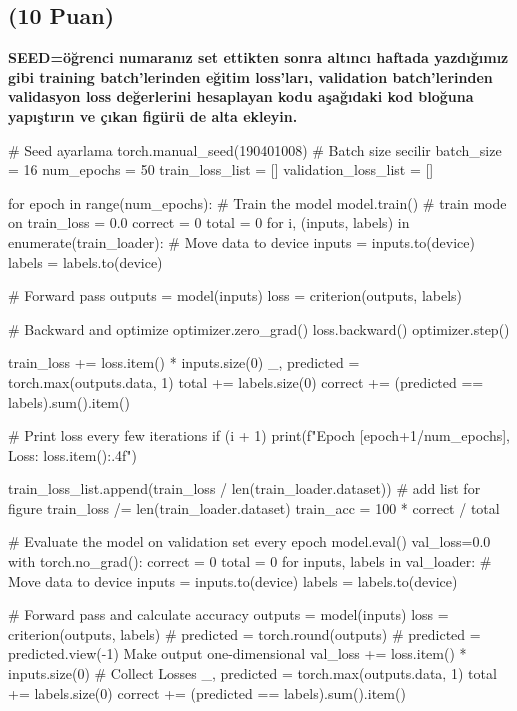 \documentclass[11pt]{article}
\begin{document}
\subsection{(10 Puan)} \textbf{SEED=öğrenci numaranız set ettikten sonra altıncı haftada yazdığımız gibi training batch'lerinden eğitim loss'ları, validation batch'lerinden validasyon loss değerlerini hesaplayan kodu aşağıdaki kod bloğuna yapıştırın ve çıkan figürü de alta ekleyin.}

\begin{python}

# Seed ayarlama
torch.manual_seed(190401008)
# Batch size secilir
batch_size = 16
num_epochs = 50
train_loss_list = []
validation_loss_list = []

for epoch in range(num_epochs):
    # Train the model
    model.train()  # train mode on
    train_loss = 0.0
    correct = 0
    total = 0
    for i, (inputs, labels) in enumerate(train_loader):
        # Move data to device
        inputs = inputs.to(device)
        labels = labels.to(device)

        # Forward pass
        outputs = model(inputs)
        loss = criterion(outputs, labels)

        # Backward and optimize
        optimizer.zero_grad()
        loss.backward()
        optimizer.step()

        train_loss += loss.item() * inputs.size(0)
        _, predicted = torch.max(outputs.data, 1)
        total += labels.size(0)
        correct += (predicted == labels).sum().item()

        # Print loss every few iterations
        if (i + 1) %
            print(f"Epoch [{epoch+1}/{num_epochs}],  Loss: {loss.item():.4f}")
        
    train_loss_list.append(train_loss / len(train_loader.dataset))  # add list for figure
    train_loss /= len(train_loader.dataset)
    train_acc = 100 * correct / total

    # Evaluate the model on validation set every epoch
    model.eval()
    val_loss=0.0
    with torch.no_grad():
        correct = 0
        total = 0
        for inputs, labels in val_loader:
            # Move data to device
            inputs = inputs.to(device)
            labels = labels.to(device)

            # Forward pass and calculate accuracy
            outputs = model(inputs)
            loss = criterion(outputs, labels)
            # predicted = torch.round(outputs)
            # predicted = predicted.view(-1)  Make output one-dimensional
            val_loss += loss.item() * inputs.size(0)  # Collect Losses
            _, predicted = torch.max(outputs.data, 1)
            total += labels.size(0)
            correct += (predicted == labels).sum().item()


\end{python}
\end{document}
